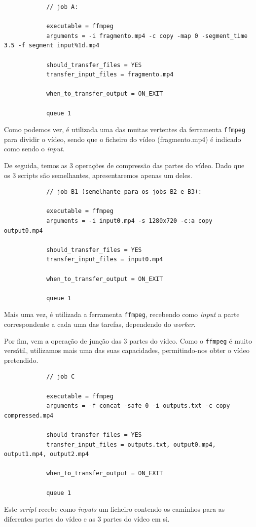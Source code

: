 \documentclass[a4paper]{report}
\begin{document}
	\small{
		\begin{verbatim}
			// job A:

			executable = ffmpeg
			arguments = -i fragmento.mp4 -c copy -map 0 -segment_time 3.5 -f segment input%1d.mp4
	
			should_transfer_files = YES
			transfer_input_files = fragmento.mp4
	
			when_to_transfer_output = ON_EXIT
	
			queue 1
		\end{verbatim}
	}
	\large{
		Como podemos ver, é utilizada uma das muitas vertentes da ferramenta \texttt{ffmpeg} para dividir o vídeo, sendo que o ficheiro do vídeo (fragmento.mp4) é indicado como sendo o \textit{input}.
		
		De seguida, temos as 3 operações de compressão das partes do vídeo. Dado que os 3 scripts são semelhantes, apresentaremos apenas um deles.
	}

	\small{
		\begin{verbatim}
			// job B1 (semelhante para os jobs B2 e B3):

			executable = ffmpeg
			arguments = -i input0.mp4 -s 1280x720 -c:a copy output0.mp4

			should_transfer_files = YES
			transfer_input_files = input0.mp4

			when_to_transfer_output = ON_EXIT

			queue 1
		\end{verbatim}
	}
	\large{
		Mais uma vez, é utilizada a ferramenta \texttt{ffmpeg}, recebendo como \textit{input} a parte correspondente a cada uma das tarefas, dependendo do \textit{worker}.
		
		Por fim, vem a operação de junção das 3 partes do vídeo. Como o \texttt{ffmpeg} é muito versátil, utilizamos mais uma das suas capacidades, permitindo-nos obter o vídeo pretendido.
	}
	
	\small{
		\begin{verbatim}
			// job C

			executable = ffmpeg
			arguments = -f concat -safe 0 -i outputs.txt -c copy compressed.mp4

			should_transfer_files = YES
			transfer_input_files = outputs.txt, output0.mp4, output1.mp4, output2.mp4

			when_to_transfer_output = ON_EXIT

			queue 1
		\end{verbatim}
	}
	\large{
		Este \textit{script} recebe como \textit{inputs} um ficheiro contendo os caminhos para as diferentes partes do vídeo e as 3 partes do vídeo em si.
	}
\end{document}
